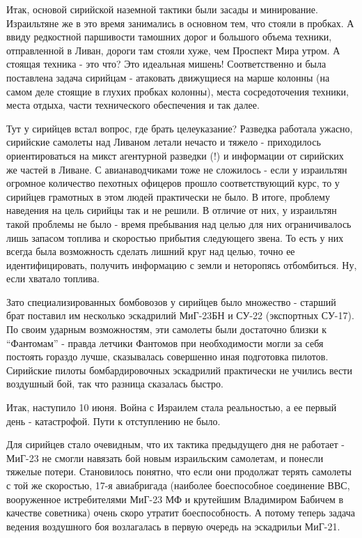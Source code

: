 Итак, основой сирийской наземной тактики были засады и минирование. Израильтяне же в это время занимались в основном тем, что стояли в пробках. А ввиду редкостной паршивости тамошних дорог и большого объема техники, отправленной в Ливан, дороги там стояли хуже, чем Проспект Мира утром. А стоящая техника - это что? Это идеальная мишень! Соответственно и была поставлена задача сирийцам - атаковать движущиеся на марше колонны (на самом деле стоящие в глухих пробках колонны), места сосредоточения техники, места отдыха, части технического обеспечения и так далее.

Тут у сирийцев встал вопрос, где брать целеуказание? Разведка работала ужасно, сирийские самолеты над Ливаном летали нечасто и тяжело - приходилось ориентироваться на микст агентурной разведки (!) и информации от сирийских же частей в Ливане. С авианаводчиками тоже не сложилось - если у израильтян огромное количество пехотных офицеров прошло соответствующий курс, то у сирийцев грамотных в этом людей практически не было. В итоге, проблему наведения на цель сирийцы так и не решили. В отличие от них, у израильтян такой проблемы не было - время пребывания над целью для них ограничивалось лишь запасом топлива и скоростью прибытия следующего звена. То есть у них всегда была возможность сделать лишний круг над целью, точно ее идентифицировать, получить информацию с земли и неторопясь отбомбиться. Ну, если хватало топлива.

Зато специализированных бомбовозов у сирийцев было множество - старший брат поставил им несколько эскадрилий МиГ-23БН и СУ-22 (экспортных СУ-17). По своим ударным возможностям, эти самолеты были достаточно близки к “Фантомам” - правда летчики Фантомов при необходимости могли за себя постоять гораздо лучше, сказывалась совершенно иная подготовка пилотов. Сирийские пилоты бомбардировочных эскадрилий практически не учились вести воздушный бой, так что разница сказалась быстро.

Итак, наступило 10 июня. Война с Израилем стала реальностью, а ее первый день - катастрофой. Пути к отступлению не было.

Для сирийцев стало очевидным, что их тактика предыдущего дня не работает - МиГ-23 не смогли навязать бой новым израильским самолетам, и понесли тяжелые потери. Становилось понятно, что если они продолжат терять самолеты с той же скоростью, 17-я авиабригада (наиболее боеспособное соединение ВВС, вооруженное истребителями МиГ-23 МФ и крутейшим Владимиром Бабичем в качестве советника) очень скоро утратит боеспособность. А потому теперь задача ведения воздушного боя возлагалась в первую очередь на эскадрильи МиГ-21.

